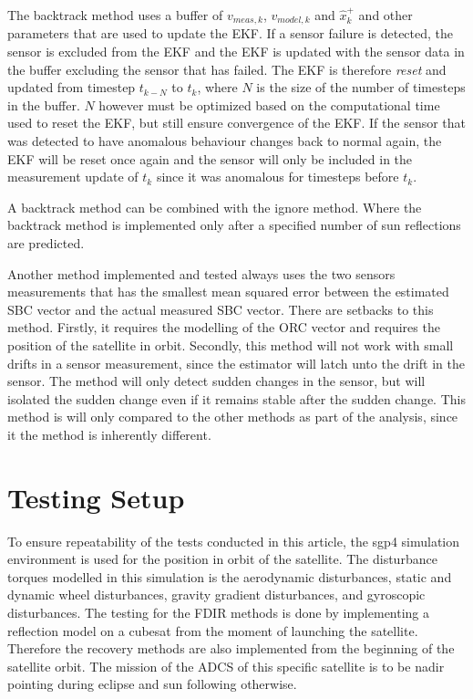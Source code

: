 \documentclass[letterpaper, 10 pt, conference]{ieeeconf}  %
\begin{document}
The backtrack method uses a buffer of $v_{meas,k}$, $v_{model,k}$ and $\hat{x}_k^+$ and other parameters that are used to update the EKF. If a sensor failure is detected, the sensor is excluded from the EKF and the EKF is updated with the sensor data in the buffer excluding the sensor that has failed. The EKF is therefore \emph{reset} and updated from timestep $t_{k-N}$ to $t_k$, where $N$ is the size of the number of timesteps in the buffer. $N$ however must be optimized based on the computational time used to reset the EKF, but still ensure convergence of the EKF. If the sensor that was detected to have anomalous behaviour changes back to normal again, the EKF will be reset once again and the sensor will only be included in the measurement update of $t_k$ since it was anomalous for timesteps before $t_k$.

A backtrack method can be combined with the ignore method. Where the backtrack method is implemented only after a specified number of sun reflections are predicted.

Another method implemented and tested always uses the two sensors measurements that has the smallest mean squared error between the estimated SBC vector and the actual measured SBC vector. There are setbacks to this method. Firstly, it requires the modelling of the ORC vector and requires the position of the satellite in orbit. Secondly, this method will not work with small drifts in a sensor measurement, since the estimator will latch unto the drift in the sensor. The method will only detect sudden changes in the sensor, but will isolated the sudden change even if it remains stable after the sudden change. This method is will only compared to the other methods as part of the analysis, since it the method is inherently different.

\section{Testing Setup}
To ensure repeatability of the tests conducted in this article, the sgp4 simulation environment is used for the position in orbit of the satellite. The disturbance torques modelled in this simulation is the aerodynamic disturbances, static and dynamic wheel disturbances, gravity gradient disturbances, and gyroscopic disturbances. The testing for the FDIR methods is done by implementing a reflection model on a cubesat from the moment of launching the satellite. Therefore the recovery methods are also implemented from the beginning of the satellite orbit. The mission of the ADCS of this specific satellite is to be nadir pointing during eclipse and sun following otherwise.
\end{document}
